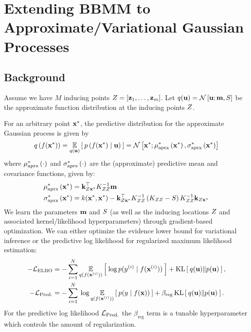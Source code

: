 \chapter{Extending BBMM to Approximate/Variational Gaussian Processes}
\label{chapter:variational}

\section{Background}

Assume we have $M$ inducing points $Z = [\mathbf{z}_1, \ldots, \mathbf{z}_m]$.
Let $q(\mathbf{u}) = \mathcal{N} \left[ \mathbf{u}; \mathbf{m}, S \right]$ be the approximate function distribution at the inducing points $Z$.

For an arbitrary point $\mathbf{x}^*$, the predictive distribution for the approximate Gaussian process is given by
%
\begin{equation}
  q \left( f(\mathbf{x}^*) \right) = \operatorname*{\mathbb{E}}_{q(\mathbf{u})} \left[  \: p\left( f(\mathbf{x}^*) \mid \mathbf{u} \right) \:  \right]
  = \mathcal{N} \left[  \mathbf{x}^*; \mu^*_\text{aprx} \left(  \mathbf{x}^*  \right),  \sigma^*_\text{aprx} \left(  \mathbf{x}^*  \right) \right]
  \label{eqn:approx_pred}
\end{equation}
%
where $\mu^*_\text{aprx} \left( \cdot \right)$ and $\sigma^*_\text{aprx} \left( \cdot \right)$ are the (approximate) predictive mean and covariance functions, given by:
%
\begin{align}
  \mu^*_\text{aprx} \left( \mathbf{x}^* \right) &= \mathbf{k}_{Z\mathbf{x}^*}^\top K_{ZZ}^{-1} \mathbf{m}
  \label{eqn:approx_pred_mean} \\
  \sigma^*_\text{aprx} \left( \mathbf{x}^* \right) &= k(\mathbf{x}^*, \mathbf{x}^*) -
    \mathbf{k}_{Z\mathbf{x}^*}^\top K_{ZZ}^{-1} \left( K_{ZZ} - S \right) K_{ZZ}^{-1} \mathbf{k}_{Z\mathbf{x}^*}
  \label{eqn:approx_pred_covar}
\end{align}
%
We learn the parameters $\mathbf{m}$ and $S$ (as well as the inducing locations $Z$ and associated kernel/likelihood hyperparameters) through gradient-based optimization.
We can either optimize the evidence lower bound \cite{hensman2015scalable} for variational inference or the predictive log likelihood \cite{jankowiak2020parametric} for regularized maximum likelihood estimation:
%
\begin{align}
	-\mathcal L_\text{ELBO} &= -\sum_{i=1}^N \operatorname*{\mathbb{E}}_{q(f(\mathbf{x}^{(i)}))} \left[   \: \log p( y^{(i)} \mid f(\mathbf{x}^{(i)}) ) \:  \right] + \operatorname*{KL} \left[ \:  q(\mathbf{u})  \Vert  p(\mathbf{u})  \: \right],
	\label{eqn:elbo}
	\\
	-\mathcal L_\text{Pred.} &= -\sum_{i=1}^N \: \log \operatorname*{\mathbb{E}}_{q(f(\mathbf{x}^{(i)}))} \left[   \: p( y \mid f(\mathbf{x}) ) \:  \right] + \beta_\text{reg} \operatorname*{KL} \left[ \:  q(\mathbf{u})  \Vert  p(\mathbf{u})  \: \right].
	\label{eqn:predll}
\end{align}
%
For the predictive log likelihood $\mathcal L_\text{Pred.}$ the $\beta_\text{reg}$ term is a tunable hyperparameter which controls the amount of regularization.




